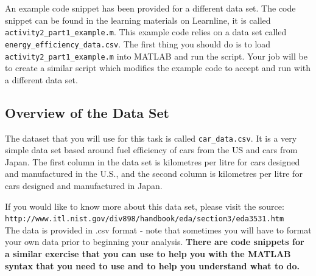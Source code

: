 \documentclass[12pt]{article}
\begin{document}
An example code snippet has been provided for a different data set. The code snippet can be found in the learning materials on Learnline, it is called \verb|activity2_part1_example.m|. This example code relies on a data set called \verb|energy_efficiency_data.csv|. The first thing you should do is to load \verb|activity2_part1_example.m| into MATLAB and run the script. Your job will be to create a similar script which modifies the example code to accept and run with a different data set.

\subsection*{Overview of the Data Set}
The dataset that you will use for this task is called \verb|car_data.csv|. It is a very simple data set based around fuel efficiency of cars from the US and cars from Japan. The first column in the data set is kilometres per litre for cars designed and manufactured in the U.S., and the second column is kilometres per litre for cars designed and manufactured in Japan.

If you would like to know more about this data set, please visit the source:\\

\verb|http://www.itl.nist.gov/div898/handbook/eda/section3/eda3531.htm|\\

The data is provided in .csv format - note that sometimes you will have to format your own data prior to beginning your analysis. \textbf{There are code snippets for a similar exercise that you can use to help you with the MATLAB syntax that you need to use and to help you understand what to do.}
\end{document}
